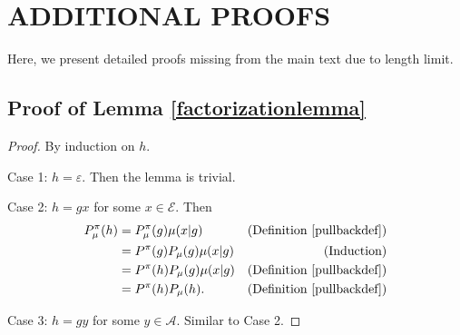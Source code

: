 \documentclass[twoside]{article}
\begin{document}


\section{ADDITIONAL PROOFS}

Here, we present detailed proofs missing from the main text due to length limit.

\subsection{Proof of Lemma \ref{factorizationlemma}}
\begin{proof}
    By induction on $h$.

    Case 1: $h=\varepsilon$. Then the lemma is trivial.

    Case 2: $h=gx$ for some $x\in\mathcal E$.
        Then
        \begin{align*}
            P^\pi_\mu(h)
                &= P^\pi_\mu(g)\mu(x|g)
                    &\mbox{(Definition \ref{pullbackdef})}\\
                &= P^\pi(g)P_\mu(g)\mu(x|g)
                    &\mbox{(Induction)}\\
                &= P^\pi(h)P_\mu(g)\mu(x|g)
                    &\mbox{(Definition \ref{pullbackdef})}\\
                &= P^\pi(h)P_\mu(h).
                    &\mbox{(Definition \ref{pullbackdef})}
        \end{align*}

    Case 3: $h=gy$ for some $y\in\mathcal A$.
        Similar to Case 2.
\end{proof}
\end{document}
